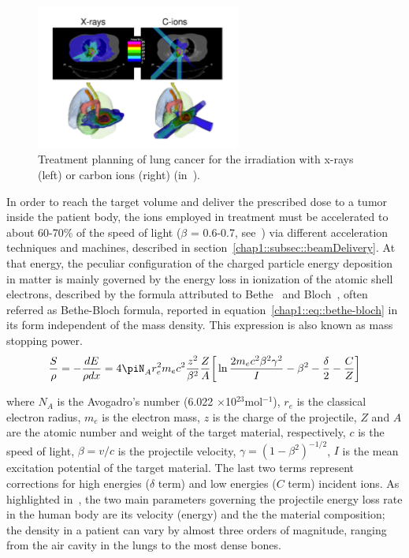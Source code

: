 \vspace{-1cm}

\begin{figure}[!htbp]
\centering
\includegraphics[width=0.6\textwidth]{03_GraphicFiles/chapter1_Introduction/xRayCions_fields.pdf}
\caption{Treatment planning of lung cancer for the irradiation with x-rays (left) or carbon ions (right) (in~\cite{Durante2016}).}
\label{chap1::fig::XraysCionsFields}
\end{figure} 

In order to reach the target volume and deliver the prescribed dose to a tumor inside the patient body, the ions employed in treatment must be accelerated to about 60-70\% of the speed of light ($\beta$ = 0.6-0.7, see~\cite{Durante2016}) via different acceleration techniques and machines, described in section~\ref{chap1::subsec::beamDelivery}. At that energy, the peculiar configuration of the charged particle energy deposition in matter is mainly governed by the energy loss in ionization of the atomic shell electrons, described by the formula attributed to Bethe~\parencite{Bethe1930} and Bloch~\parencite{Bloch1933}, often referred as Bethe-Bloch formula, reported in equation~\ref{chap1::eq::bethe-bloch} in its form independent of the mass density. This expression is also known as mass stopping power.\\
  
\begin{equation}
\frac{S}{\rho} = -\frac{dE}{\rho dx} = 4\piN_{A}r^{2}_{e}m_{e}c^{2}\frac{z^{2}}{\beta^{2}}\frac{Z}{A}\bigg[\ln{\frac{2m_{e}c^{2}\beta^{2}\gamma^{2}}{I}}-\beta^{2}-\frac{\delta}{2}-\frac{C}{Z}\bigg]
\label{chap1::eq::bethe-bloch}
\end{equation}

where $N_{A}$ is the Avogadro's number (6.022 $\times$10$^{23}$mol$^{-1}$), $r_{e}$ is the classical electron radius, $m_{e}$ is the electron mass, $z$ is the charge of the projectile, $Z$ and $A$ are the atomic number and weight of the target material, respectively, $c$ is the speed of light, $\beta = v/c$ is the projectile velocity, $\gamma = (1-\beta^{2})^{-1/2}$, $I$ is the mean excitation potential of the target material. The last two terms represent corrections for high energies ($\delta$ term) and low energies ($C$ term) incident ions. As highlighted in~\cite{Newhauser2015}, the two main parameters governing the projectile energy loss rate in the human body are its velocity (energy) and the the material composition; the density in a patient can vary by almost three orders of magnitude, ranging from the air cavity in the lungs to the most dense bones. 

